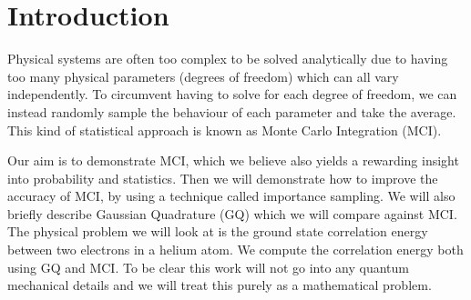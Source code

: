 \section{Introduction}

Physical systems are often too complex to be solved analytically due to having
too many physical parameters (degrees of freedom) which can all vary
independently. To circumvent having to solve for each degree of
freedom, we can instead randomly sample the behaviour of each parameter
and take the average. This kind of statistical approach is known as Monte Carlo
Integration (MCI).

Our aim is to demonstrate MCI, which we believe also yields
a rewarding insight into probability and statistics.  Then we
will demonstrate how to improve the accuracy of MCI, by
using a technique called importance sampling. We will also briefly describe
Gaussian Quadrature (GQ) which we will compare against MCI. The
physical problem we will look at is the ground state
correlation energy between two electrons in a helium atom. We compute the
correlation energy both using GQ and MCI. To be clear this work
will not go into any quantum mechanical details and we will treat this purely
as a mathematical problem.
